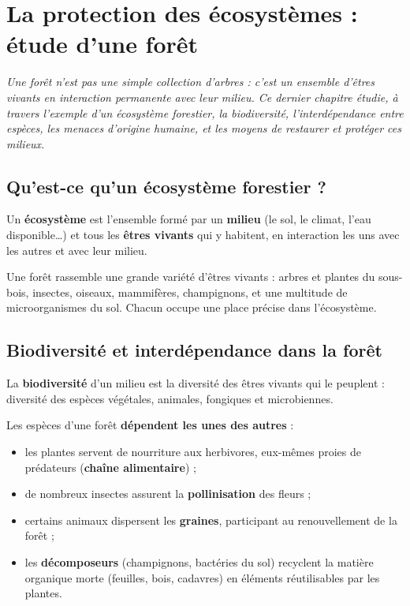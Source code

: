 \chapter{La protection des écosystèmes : étude d'une forêt}

\noindent\textit{Une forêt n'est pas une simple collection d'arbres : c'est un
ensemble d'êtres vivants en interaction permanente avec leur milieu. Ce dernier
chapitre étudie, à travers l'exemple d'un écosystème forestier, la biodiversité,
l'interdépendance entre espèces, les menaces d'origine humaine, et les moyens de
restaurer et protéger ces milieux.}
\vspace{8pt}

\connecteBanner

\section{Qu'est-ce qu'un écosystème forestier ?}

\begin{definition}[Écosystème]
Un \textbf{écosystème} est l'ensemble formé par un \textbf{milieu} (le sol, le
climat, l'eau disponible\dots) et tous les \textbf{êtres vivants} qui y habitent, en
interaction les uns avec les autres et avec leur milieu.
\end{definition}

\begin{propriete}
Une forêt rassemble une grande variété d'êtres vivants : arbres et plantes du
sous-bois, insectes, oiseaux, mammifères, champignons, et une multitude de
microorganismes du sol. Chacun occupe une place précise dans l'écosystème.
\end{propriete}

\section{Biodiversité et interdépendance dans la forêt}

\begin{definition}[Biodiversité]
La \textbf{biodiversité} d'un milieu est la diversité des êtres vivants qui le
peuplent : diversité des espèces végétales, animales, fongiques et microbiennes.
\end{definition}

\begin{propriete}
Les espèces d'une forêt \textbf{dépendent les unes des autres} :
\begin{itemize}
\item les plantes servent de nourriture aux herbivores, eux-mêmes proies de
prédateurs (\textbf{chaîne alimentaire}) ;
\item de nombreux insectes assurent la \textbf{pollinisation} des fleurs ;
\item certains animaux dispersent les \textbf{graines}, participant au
renouvellement de la forêt ;
\item les \textbf{décomposeurs} (champignons, bactéries du sol) recyclent la matière
organique morte (feuilles, bois, cadavres) en éléments réutilisables par les
plantes.
\end{itemize}
\end{propriete}

